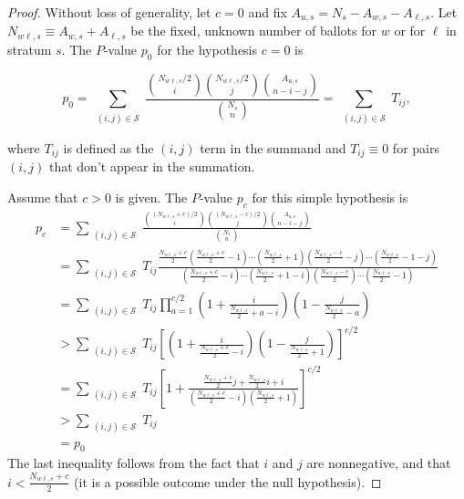 \documentclass[runningheads]{llncs}
\begin{document}
\begin{proof}
Without loss of generality, let $c=0$ and fix $A_{u,s}=N_s - A_{w,s} - A_{\ell,s}$.
Let $N_{w\ell, s} \equiv A_{w,s}+A_{\ell,s}$ be the fixed, unknown number of ballots for $w$ or for $\ell$ in stratum $s$.
The $P$-value $p_0$ for the hypothesis $c=0$ is

\begin{equation}
  p_0 = \sum_{\substack{(i, j) \in \mathcal{S}}} \frac{ {N_{w\ell, s}/2 \choose i}{N_{w\ell, s}/2 \choose j}{A_{u,s} \choose n-i-j}}{{N_s \choose n}} =  \sum_{\substack{(i, j) \in \mathcal{S}}}T_{ij},
\end{equation}

\noindent 
where $T_{ij}$ is defined as the $(i, j)$ term in the summand and $T_{ij} \equiv 0$ for pairs $(i, j)$ that don't appear in the summation.

Assume that $c>0$ is given.
The $P$-value $p_c$ for this simple hypothesis is
\begin{align*}
p_c &=   \sum_{\substack{(i, j) \in \mathcal{S}}}  \frac{ {(N_{w\ell, s}+c)/2 \choose i}{(N_{w\ell, s}-c)/2 \choose j}{A_{u,s} \choose n-i-j}}{{N_s \choose n}}  \\
   &=\sum_{\substack{(i, j) \in \mathcal{S}}} T_{ij} \frac{ \frac{N_{w\ell, s}+c}{2}(\frac{N_{w\ell, s}+c}{2}-1)\cdots(\frac{N_{w\ell, s}}{2}+1) (\frac{N_{w\ell, s}-c}{2} -j)\cdots(\frac{N_{w\ell, s}}{2}-1-j) }
   {(\frac{N_{w\ell, s}+c}{2} -i)\cdots(\frac{N_{w\ell, s}}{2}+1-i)(\frac{N_{w\ell, s}-c}{2})\cdots(\frac{N_{w\ell, s}}{2}-1)} \\
&= \sum_{\substack{(i, j) \in \mathcal{S}}} T_{ij} \prod_{a=1}^{c/2} \left(1 + \frac{i}{\frac{N_{w\ell,s}}{2} + a-i}\right)\left(1 - \frac{j}{\frac{N_{w\ell, s}}{2} - a}\right) \\
&> \sum_{\substack{(i, j) \in \mathcal{S}}}  T_{ij} \left[ \left(1 + \frac{i}{\frac{N_{w\ell,s}+c}{2} -i}\right)\left(1 - \frac{j}{\frac{N_{w\ell, s}}{2}+1}\right) \right]^{c/2} \\
&= \sum_{\substack{(i, j) \in \mathcal{S}}} T_{ij} \left[ 1 + \frac{\frac{N_{w\ell,s}+c}{2}j + \frac{N_{w\ell,s}}{2}i + i}{(\frac{N_{w\ell,s}+c}{2}-i)(\frac{N_{w\ell,s}}{2}+1)}\right]^{c/2} \\
&> \sum_{\substack{(i, j) \in \mathcal{S}}}  T_{ij}\\
&= p_0
\end{align*}
The last inequality follows from the fact that $i$ and $j$ are nonnegative, and 
that $i < \frac{N_{w\ell,s}+c}{2}$ (it is a possible outcome under the null hypothesis).
\end{proof}
\end{document}
